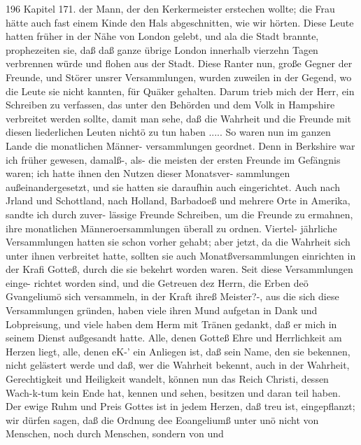 196 Kapitel 171.
der Mann, der den Kerkermeister erstechen wollte; die Frau hätte
auch fast einem Kinde den Hals abgeschnitten, wie wir hörten.
Diese Leute hatten früher in der Nähe von London gelebt, und ala
die Stadt brannte, prophezeiten sie, daß daß ganze übrige London
innerhalb vierzehn Tagen verbrennen würde und flohen aus der
Stadt. Diese Ranter nun, große Gegner der Freunde, und Störer
unsrer Versammlungen, wurden zuweilen in der Gegend, wo die
Leute sie nicht kannten, für Quäker gehalten. Darum trieb mich
der Herr, ein Schreiben zu verfassen, das unter den Behörden
und dem Volk in Hampshire verbreitet werden sollte, damit man
sehe, daß die Wahrheit und die Freunde mit diesen liederlichen
Leuten nichtö zu tun haben .....
So waren nun im ganzen Lande die monatlichen Männer-
versammlungen geordnet. Denn in Berkshire war ich früher
gewesen, damalß-, als- die meisten der ersten Freunde im
Gefängnis waren; ich hatte ihnen den Nutzen dieser Monatsver-
sammlungen außeinandergesetzt, und sie hatten sie daraufhin auch
eingerichtet. Auch nach Jrland und Schottland, nach Holland,
Barbadoeß und mehrere Orte in Amerika, sandte ich durch zuver-
lässige Freunde Schreiben, um die Freunde zu ermahnen, ihre
monatlichen Männeroersammlungen überall zu ordnen. Viertel-
jährliche Versammlungen hatten sie schon vorher gehabt; aber
jetzt, da die Wahrheit sich unter ihnen verbreitet hatte, sollten sie
auch Monatßversammlungen einrichten in der Krafi Gotteß, durch
die sie bekehrt worden waren. Seit diese Versammlungen einge-
richtet worden sind, und die Getreuen dez Herrn, die Erben deö
Gvangeliumö sich versammeln, in der Kraft ihreß Meister?-, aus
die sich diese Versammlungen gründen, haben viele ihren Mund
aufgetan in Dank und Lobpreisung, und viele haben dem Herm
mit Tränen gedankt, daß er mich in seinem Dienst außgesandt
hatte. Alle, denen Gotteß Ehre und Herrlichkeit am Herzen liegt,
alle, denen eK-’ ein Anliegen ist, daß sein Name, den sie bekennen,
nicht gelästert werde und daß, wer die Wahrheit bekennt, auch
in der Wahrheit, Gerechtigkeit und Heiligkeit wandelt, können nun
das Reich Christi, dessen Wach-k-tum kein Ende hat, kennen und
sehen, besitzen und daran teil haben. Der ewige Ruhm und Preis
Gottes ist in jedem Herzen, daß treu ist, eingepflanzt; wir
dürfen sagen, daß die Ordnung dee Eoangeliumß unter unö
nicht von Menschen, noch durch Menschen, sondern von und



